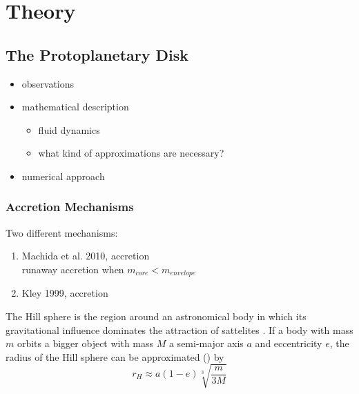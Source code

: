 
\chapter{Theory}

\section{The Protoplanetary Disk}
  \begin{itemize}
    \item observations
    \item mathematical description
      \begin{itemize}
        \item fluid dynamics
        \item what kind of approximations are necessary?
      \end{itemize}
    \item numerical approach
  \end{itemize}


\subsection{Accretion Mechanisms}
  Two different mechanisms:
  \begin{enumerate}
    \item Machida et al. 2010, accretion \\
    runaway accretion when $m_{core}<m_{envelope}$
    \item Kley 1999, accretion
  \end{enumerate} 

  The Hill sphere is the region around an astronomical body in which its
  gravitational influence dominates the attraction of sattelites
  \cite{def hill radius}. If a body with mass $m$ orbits a bigger object 
  with mass $M$  a semi-major axis $a$ and eccentricity $e$, the 
  radius of the Hill sphere can be approximated
  () by
  \begin{equation}
    r_H\approx a(1-e)\sqrt[3]{\frac{m}{3M}}
    \label{eq: def hill radius}
  \end{equation}

